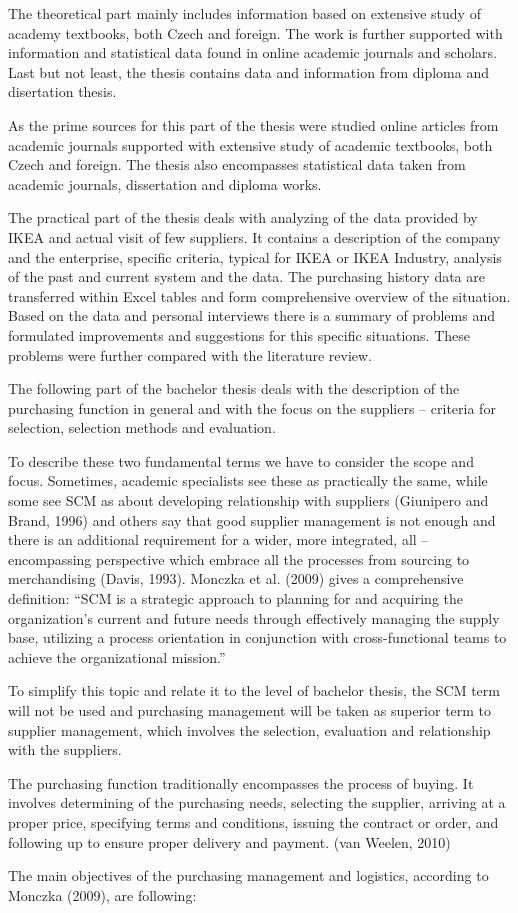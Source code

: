 \documentclass[oneside,12pt]{article}%
\begin{document}
The theoretical part mainly includes information based on extensive study of academy textbooks, both Czech and foreign. The work is further supported with information and statistical data found in online academic journals and scholars. Last but not least, the thesis contains data and information from diploma and disertation thesis. \par
As the prime sources for this part of the thesis were studied online articles from academic journals supported with extensive study of academic textbooks, both Czech and foreign. The thesis also encompasses statistical data taken from academic journals, dissertation and diploma works. \par
The practical part of the thesis deals with analyzing of the data provided by IKEA and actual visit of few suppliers. It contains a description of the company and the enterprise, specific criteria, typical for IKEA or IKEA Industry, analysis of the past and current system and the data. The purchasing history data are transferred within Excel tables and form comprehensive overview of the situation. Based on the data and personal interviews there is a summary of problems and formulated improvements and suggestions for this specific situations. These problems were further compared with the literature review.

The following part of the bachelor thesis deals with the description of the purchasing function in general and with the focus on the suppliers – criteria for selection, selection methods and evaluation.

To describe these two fundamental terms we have to consider the scope and focus. Sometimes, academic specialists see these as practically the same, while some see SCM as about developing relationship with suppliers (Giunipero and Brand, 1996) and others say that good supplier management is not enough and there is an additional requirement for a wider, more integrated, all – encompassing perspective which embrace all the processes from sourcing to merchandising (Davis, 1993). Monczka et al. (2009) gives a comprehensive definition: “SCM is a strategic approach to planning for and acquiring the organization’s current and future needs through effectively managing the supply base, utilizing a process orientation in conjunction with cross-functional teams to achieve the organizational mission.” \par
To simplify this topic and relate it to the level of bachelor thesis, the SCM term will not be used and purchasing management will be taken as superior term to supplier management, which involves the selection, evaluation and relationship with the suppliers.\par
The purchasing function traditionally encompasses the process of buying. It involves determining of the purchasing needs, selecting the supplier, arriving at a proper price, specifying terms and conditions, issuing the contract or order, and following up to ensure proper delivery and payment. (van Weelen, 2010) \par
The main objectives of the purchasing management and logistics, according to Monczka (2009), are following:
\end{document}
